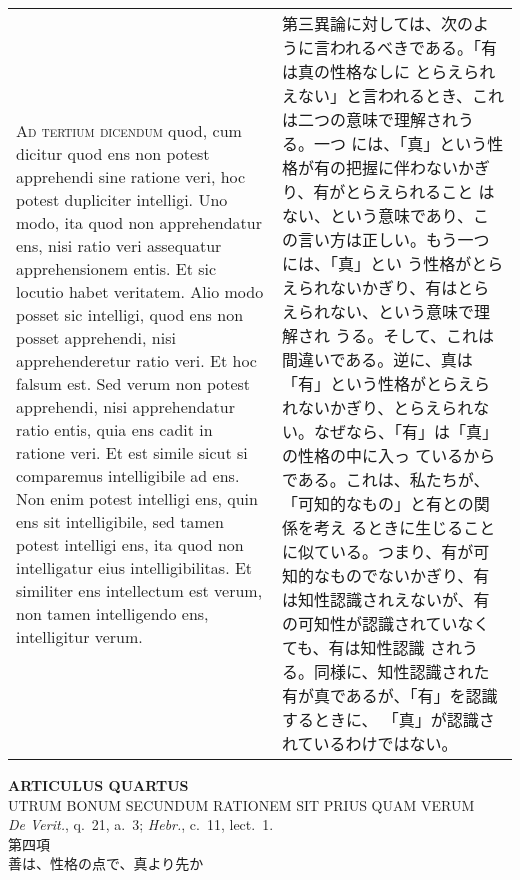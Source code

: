 \documentclass[10pt]{jsarticle} %
\begin{document}
\begin{longtable}{p{21em}p{21em}}
{\scshape Ad tertium dicendum} quod, cum dicitur quod ens non potest
apprehendi sine ratione veri, hoc potest dupliciter intelligi. Uno
modo, ita quod non apprehendatur ens, nisi ratio veri assequatur
apprehensionem entis. Et sic locutio habet veritatem. Alio modo posset
sic intelligi, quod ens non posset apprehendi, nisi apprehenderetur
ratio veri. Et hoc falsum est. Sed verum non potest apprehendi, nisi
apprehendatur ratio entis, quia ens cadit in ratione veri. Et est
simile sicut si comparemus intelligibile ad ens. Non enim potest
intelligi ens, quin ens sit intelligibile, sed tamen potest intelligi
ens, ita quod non intelligatur eius intelligibilitas. Et similiter ens
intellectum est verum, non tamen intelligendo ens, intelligitur verum.


&

第三異論に対しては、次のように言われるべきである。「有は真の性格なしに
とらえられえない」と言われるとき、これは二つの意味で理解されうる。一つ
には、「真」という性格が有の把握に伴わないかぎり、有がとらえられること
はない、という意味であり、この言い方は正しい。もう一つには、「真」とい
う性格がとらえられないかぎり、有はとらえられない、という意味で理解され
うる。そして、これは間違いである。逆に、真は「有」という性格がとらえら
れないかぎり、とらえられない。なぜなら、「有」は「真」の性格の中に入っ
ているからである。これは、私たちが、「可知的なもの」と有との関係を考え
るときに生じることに似ている。つまり、有が可知的なものでないかぎり、有
は知性認識されえないが、有の可知性が認識されていなくても、有は知性認識
されうる。同様に、知性認識された有が真であるが、「有」を認識するときに、
「真」が認識されているわけではない。

\end{longtable}
\newpage


\begin{center}
 {\Large {\bf ARTICULUS QUARTUS}}\\
 {\large UTRUM BONUM SECUNDUM RATIONEM SIT PRIUS QUAM VERUM}\\
 {\footnotesize {\itshape De Verit.}, q.~21, a.~3; {\itshape Hebr.},
 c.~11, lect.~1.}\\
 {\Large 第四項\\善は、性格の点で、真より先か}
\end{center}
\end{document}

